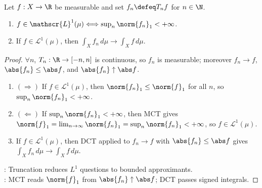 \begin{proposition} \label{prop:truncation-characterization-integrability} \\
Let $f:X\to\R$ be measurable and set $f_n\defeq T_nf$ for $n\in\N$.
\begin{enumerate}[label=(\roman*)]
\setlength{\itemsep}{0pt}
\item $f\in\mathscr{L}^1(\mu)\Longleftrightarrow \sup_n\norm{f_n}_1<+\infty$.
\item If $f\in\mathscr{L}^1(\mu)$, then $\int_Xf_n\,d\mu\to\int_Xf\,d\mu$.
\end{enumerate}
\begin{proof} $\forall n$, $T_n:\R\to[-n,n]$ is continuous, so $f_n$ is measurable; moreover $f_n\to f$, $\abs{f_n}\leq\abs f$, and $\abs{f_n}\uparrow\abs f$.
\begin{enumerate}[label=(\roman*)]
\setlength{\itemsep}{0pt}
\item[$(i)$]$(\Rightarrow)$ If $f\in\mathscr{L}^1(\mu)$, then $\norm{f_n}_1\leq\norm{f}_1$ for all $n$, so $\sup_n\norm{f_n}_1<+\infty$. 
\item[$(i)$]$(\Leftarrow)$ If $\sup_n\norm{f_n}_1<+\infty$, then MCT gives $\norm{f}_1=\lim_{n\to\infty}\norm{f_n}_1=\sup_n\norm{f_n}_1<+\infty$, so $f\in\mathscr{L}^1(\mu)$.
\item[$(ii)$] If $f\in\mathscr{L}^1(\mu)$, then DCT applied to $f_n\to f$ with $\abs{f_n}\leq\abs f$ gives $\int_Xf_n\,d\mu\to\int_Xf\,d\mu$.
\end{enumerate}
: Truncation reduces $L^1$ questions to bounded approximants.\\
: MCT reads $\norm{f}_1$ from $\abs{f_n}\uparrow\abs f$; DCT passes signed integrals.
\end{proof}
\end{proposition}
